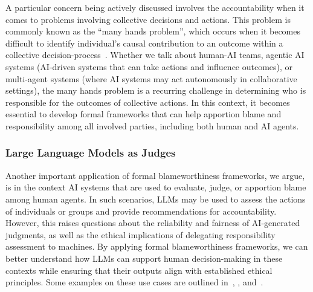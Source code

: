 \documentclass{article}
\begin{document}
A particular concern being actively discussed involves the accountability when it comes to problems involving collective decisions and actions. This problem is commonly known as the ``many hands problem'', which occurs when it becomes difficult to identify individual's causal contribution to an outcome within a collective decision-process~\cite{dastani_responsibility_2023}. Whether we talk about human-AI teams, agentic AI systems (AI-driven systems that can take actions and influence outcomes), or multi-agent systems (where AI systems may act autonomously in collaborative settings), the many hands problem is a recurring challenge in determining who is responsible for the outcomes of collective actions. In this context, it becomes essential to develop formal frameworks that can help apportion blame and responsibility among all involved parties, including both human and AI agents.

\subsubsection{Large Language Models as Judges}


Another important application of formal blameworthiness frameworks, we argue, is in the context AI systems that are used to evaluate, judge, or apportion blame among human agents. In such scenarios, LLMs may be used to assess the actions of individuals or groups and provide recommendations for accountability. However, this raises questions about the reliability and fairness of AI-generated judgments, as well as the ethical implications of delegating responsibility assessment to machines. By applying formal blameworthiness frameworks, we can better understand how LLMs can support human decision-making in these contexts while ensuring that their outputs align with established ethical principles. Some examples on these use cases are outlined in~\cite{dong_can_2024}, \cite{10.1093/jla/laae009}, and~\cite{posner2025judge}.
\end{document}
